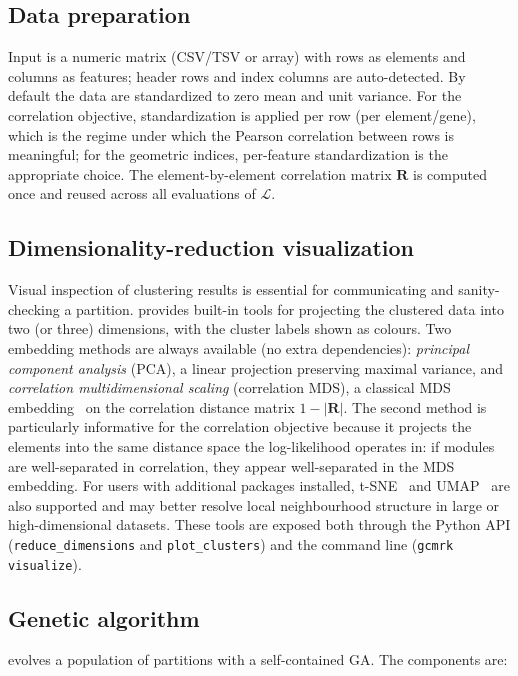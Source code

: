 \subsection*{Data preparation}
Input is a numeric matrix (CSV/TSV or array) with rows as elements and columns
as features; header rows and index columns are auto-detected. By default the
data are standardized to zero mean and unit variance. For the correlation
objective, standardization is applied per row (per element/gene), which is the
regime under which the Pearson correlation between rows is meaningful; for the
geometric indices, per-feature standardization is the appropriate choice. The
element-by-element correlation matrix $\mathbf{R}$ is computed once and reused
across all evaluations of $\mathcal{L}$.

\subsection*{Dimensionality-reduction visualization}
Visual inspection of clustering results is essential for communicating and
sanity-checking a partition.  \tool{} provides built-in tools for projecting the
clustered data into two (or three) dimensions, with the cluster labels shown as
colours.  Two embedding methods are always available (no extra dependencies):
\emph{principal component analysis} (PCA), a linear projection preserving maximal
variance, and \emph{correlation multidimensional scaling} (correlation MDS), a
classical MDS embedding~\cite{Torgerson1952} on the correlation distance matrix
$1 - \lvert\mathbf{R}\rvert$.  The second method is particularly informative for
the correlation objective because it projects the elements into the same distance
space the log-likelihood operates in: if modules are well-separated in
correlation, they appear well-separated in the MDS embedding.  For users with
additional packages installed, t-SNE~\cite{vanderMaaten2008} and
UMAP~\cite{McInnes2018} are also supported and may better resolve local
neighbourhood structure in large or high-dimensional datasets.  These tools are
exposed both through the Python API (\texttt{reduce\_dimensions} and
\texttt{plot\_clusters}) and the command line (\texttt{gcmrk visualize}).

\subsection*{Genetic algorithm}
\tool{} evolves a population of partitions with a self-contained GA. The components are:


